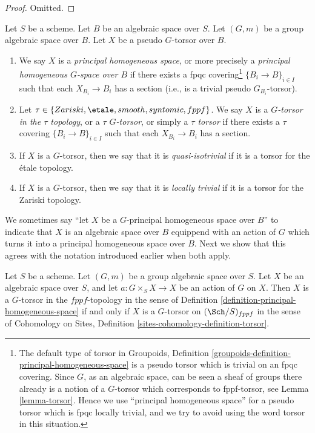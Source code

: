 \begin{proof}
Omitted.
\end{proof}

\begin{definition}
\label{definition-principal-homogeneous-space}
Let $S$ be a scheme.
Let $B$ be an algebraic space over $S$.
Let $(G, m)$ be a group algebraic space over $B$.
Let $X$ be a pseudo $G$-torsor over $B$.
\begin{enumerate}
\item We say $X$ is a
{\it principal homogeneous space}, or more precisely a
{\it principal homogeneous $G$-space over $B$}
if there exists a fpqc covering\footnote{The default type of torsor in
Groupoids, Definition \ref{groupoids-definition-principal-homogeneous-space}
is a pseudo torsor which is trivial on an fpqc covering.
Since $G$, as an algebraic space, can be seen a sheaf of groups
there already is a notion of a $G$-torsor which corresponds
to fppf-torsor, see
Lemma \ref{lemma-torsor}.
Hence we use ``principal homogeneous space'' for a pseudo torsor which
is fpqc locally trivial, and we try to avoid using the word torsor in
this situation.}
$\{B_i \to B\}_{i \in I}$ such that each
$X_{B_i} \to B_i$ has a section (i.e., is a trivial pseudo $G_{B_i}$-torsor).
\item Let $\tau \in \{Zariski, \etale, smooth, syntomic, fppf\}$.
We say $X$ is a {\it $G$-torsor in the $\tau$ topology}, or a
{\it $\tau$ $G$-torsor}, or simply a {\it $\tau$ torsor}
if there exists a $\tau$ covering $\{B_i \to B\}_{i \in I}$
such that each $X_{B_i} \to B_i$ has a section.
\item If $X$ is a $G$-torsor, then we say that it is
{\it quasi-isotrivial} if it is a torsor for the \'etale topology.
\item If $X$ is a $G$-torsor, then we say that it is
{\it locally trivial} if it is a torsor for the Zariski topology.
\end{enumerate}
\end{definition}

\noindent
We sometimes say ``let $X$ be a $G$-principal homogeneous space over $B$''
to indicate that $X$ is an algebraic space over $B$ equippend with an
action of $G$ which turns it into a principal homogeneous space over $B$.
Next we show that this agrees with the notation introduced earlier
when both apply.

\begin{lemma}
\label{lemma-torsor}
Let $S$ be a scheme.
Let $(G, m)$ be a group algebraic space over $S$.
Let $X$ be an algebraic space over $S$, and let
$a : G \times_S X \to X$ be an action of $G$ on $X$.
Then
$X$ is a $G$-torsor in the $fppf$-topology in the sense of
Definition \ref{definition-principal-homogeneous-space}
if and only if
$X$ is a $G$-torsor on $(\Sch/S)_{fppf}$
in the sense of
Cohomology on Sites, Definition \ref{sites-cohomology-definition-torsor}.
\end{lemma}

